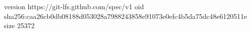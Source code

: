 version https://git-lfs.github.com/spec/v1
oid sha256:caa26cb0db08188d053028a7988243858e91073e0efc4b5da75dc48e6120511e
size 25372
